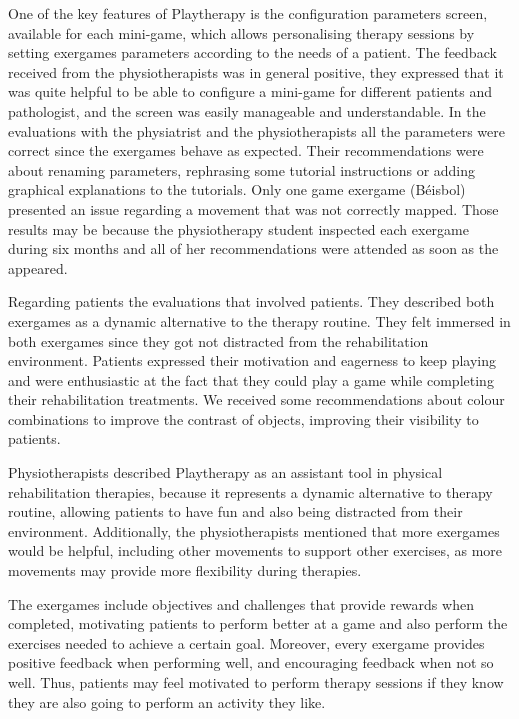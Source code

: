 One of the key features of Playtherapy is the configuration parameters screen, available for each mini-game, which allows personalising therapy sessions by setting exergames parameters according to the needs of a patient. The feedback received from the physiotherapists was in general positive, they expressed that it was quite helpful to be able to configure a mini-game for different patients and pathologist, and the screen was easily manageable and understandable. In the evaluations with the physiatrist and the physiotherapists all the parameters were correct since the exergames behave as expected. Their recommendations were about renaming parameters, rephrasing some tutorial instructions or adding graphical explanations to the tutorials. Only one game exergame (B\'eisbol) presented an issue regarding a movement that was not correctly mapped. Those results may be because the physiotherapy student inspected each exergame during six months and all of her recommendations were attended as soon as the appeared.

Regarding patients the evaluations that involved patients. They described both exergames as a dynamic alternative to the therapy routine. They felt immersed in both exergames since they got not distracted from the rehabilitation environment. Patients expressed their motivation and eagerness to keep playing and were enthusiastic at the fact that they could play a game while completing their rehabilitation treatments. We received some recommendations about colour combinations to improve the contrast of objects, improving their visibility to patients.

Physiotherapists described Playtherapy as an assistant tool in physical rehabilitation therapies, because it represents a dynamic alternative to therapy routine, allowing patients to have fun and also being distracted from their environment. Additionally, the physiotherapists mentioned that more exergames would be helpful, including other movements to support other exercises, as more movements may provide more flexibility during therapies.

The exergames include objectives and challenges that provide rewards when completed, motivating patients to perform better at a game and also perform the exercises needed to achieve a certain goal. Moreover, every exergame provides positive feedback when performing well, and encouraging feedback when not so well. Thus, patients may feel motivated to perform therapy sessions if they know they are also going to perform an activity they like.

